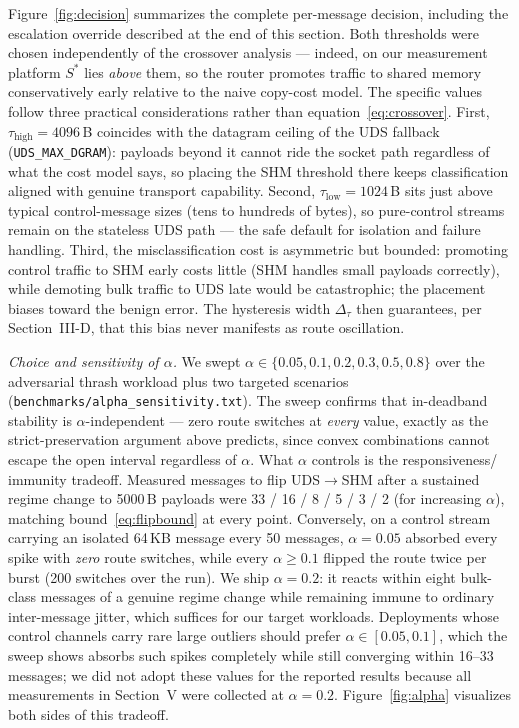 \documentclass[conference]{IEEEtran}
\newcommand{\taulow}{\tau_{\mathrm{low}}}
\newcommand{\tauhigh}{\tau_{\mathrm{high}}}
\begin{document}
Figure~\ref{fig:decision} summarizes the complete per-message decision,
including the escalation override described at the end of this section.
Both thresholds were chosen independently of the crossover analysis ---
indeed, on our measurement platform $S^{*}$ lies \emph{above} them, so the
router promotes traffic to shared memory conservatively early relative to
the naive copy-cost model. The specific values follow three practical
considerations rather than equation~\eqref{eq:crossover}. First,
$\tauhigh = 4096$\,B coincides with the datagram ceiling of the UDS
fallback (\texttt{UDS\_MAX\_DGRAM}): payloads beyond it cannot ride the
socket path regardless of what the cost model says, so placing the SHM
threshold there keeps classification aligned with genuine transport
capability. Second, $\taulow = 1024$\,B sits just above typical
control-message sizes (tens to hundreds of bytes), so pure-control streams
remain on the stateless UDS path --- the safe default for isolation and
failure handling. Third, the misclassification cost is asymmetric but
bounded: promoting control traffic to SHM early costs little (SHM handles
small payloads correctly), while demoting bulk traffic to UDS late would be
catastrophic; the placement biases toward the benign error. The hysteresis
width $\Delta_\tau$ then guarantees, per Section~III-D, that this bias
never manifests as route oscillation.

\emph{Choice and sensitivity of $\alpha$.} We swept
$\alpha \in \{0.05, 0.1, 0.2, 0.3, 0.5, 0.8\}$ over the adversarial thrash
workload plus two targeted scenarios
(\texttt{benchmarks/alpha\_sensitivity.txt}). The sweep confirms that
in-deadband stability is $\alpha$-independent --- zero route switches at
\emph{every} value, exactly as the strict-preservation argument above
predicts, since convex combinations cannot escape the open interval
regardless of $\alpha$. What $\alpha$ controls is the responsiveness/
immunity tradeoff. Measured messages to flip UDS$\rightarrow$SHM after a
sustained regime change to 5000\,B payloads were 33 / 16 / 8 / 5 / 3 / 2
(for increasing $\alpha$), matching bound~\eqref{eq:flipbound} at every
point. Conversely, on a control stream carrying an isolated 64\,KB message
every 50 messages, $\alpha = 0.05$ absorbed every spike with \emph{zero}
route switches, while every $\alpha \geq 0.1$ flipped the route twice per
burst (200 switches over the run). We ship $\alpha = 0.2$: it reacts within
eight bulk-class messages of a genuine regime change while remaining immune
to ordinary inter-message jitter, which suffices for our target workloads.
Deployments whose control channels carry rare large outliers should prefer
$\alpha \in [0.05, 0.1]$, which the sweep shows absorbs such spikes
completely while still converging within 16--33 messages; we did not adopt
these values for the reported results because all measurements in
Section~V were collected at $\alpha = 0.2$.
Figure~\ref{fig:alpha} visualizes both sides of this tradeoff.
\end{document}
